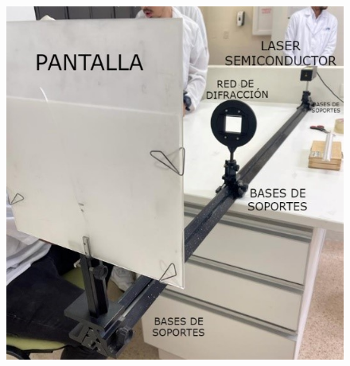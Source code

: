 \documentclass[twocolumn, 12pt]{article}
\begin{document}
\begin{figure}[H]
      \begin{center}
            \includegraphics[width=.9\linewidth]{./Images/2.jpg}
            \caption{}
      \end{center}
\end{figure}

\vspace{-.5cm}
\end{document}
